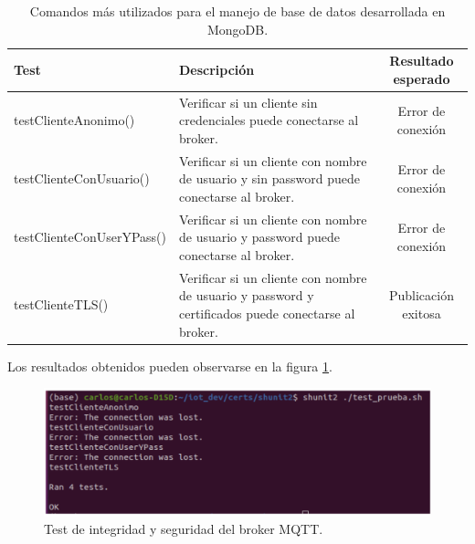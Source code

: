 \begin{table}[h]
	\centering
	\caption[Comandos utilizados en MongoDB]{Comandos más utilizados para el manejo de base de datos desarrollada en MongoDB.}
	\begin{tabular}{l p{4.5cm} c }    
		\toprule
		\textbf{Test} 	 										& \textbf{Descripción} 																						& \textbf{Resultado esperado}\\
		\midrule
	
		testClienteAnonimo()			& Verificar si un cliente sin credenciales puede conectarse al broker.    				& Error de conexión\\		
		
		testClienteConUsuario() 			& Verificar si un cliente con nombre de usuario y sin password puede conectarse al broker.    				& Error de conexión\\		
		
		testClienteConUserYPass() 		& Verificar si un cliente con nombre de usuario y password puede conectarse al broker.    				& Error de conexión\\	
		
		testClienteTLS()						& Verificar si un cliente con nombre de usuario y password y certificados puede conectarse al broker.    				& Publicación exitosa\\	
		\bottomrule
		\hline
	\end{tabular}
	\label{tab:test-mqtt}
\end{table}

\pagebreak

Los resultados obtenidos pueden observarse en la figura \ref{fig:mqtt-test}.

\begin{figure}[htpb]
	\centering
	\includegraphics[scale=.35]{./Figures/mqtt-test.png}
	\caption[Testing broker MQTT]{Test de integridad y seguridad del broker MQTT.}
	\label{fig:mqtt-test}
\end{figure}




